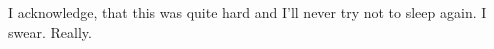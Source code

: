\noindent
I acknowledge, that this was quite hard and I'll never try not to sleep again. I swear. Really.

\cleardoublepage